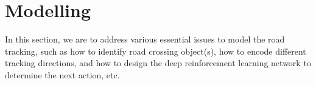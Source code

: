 \documentclass{svproc}
\begin{document}
	
	\section{Modelling}
	In this section, we are to address various essential issues to model the road tracking, such as how to identify road crossing object(s), how to encode different tracking directions, and how to design the deep reinforcement learning network to determine the next action, etc. 
\end{document}
